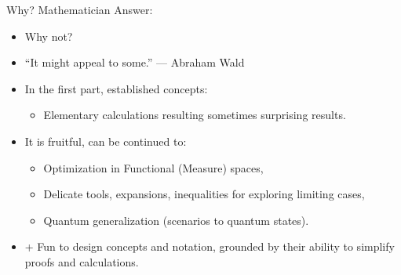\documentclass{beamer}
\theoremstyle{definition}
\begin{document}
\begin{frame}{Why? Mathematician Answer:}

\begin{itemize}
    \item Why not?
    \item ``It might appeal to some.'' --- Abraham Wald
    \item In the first part, established concepts:
    \begin{itemize}
        \item Elementary calculations resulting sometimes surprising results.
    \end{itemize}
    \item It is fruitful, can be continued to:
    \begin{itemize}
        \item Optimization in Functional (Measure) spaces,
        \item Delicate tools, expansions, inequalities for exploring limiting cases,
        \item Quantum generalization (scenarios to quantum states).
    \end{itemize}
    \item + Fun to design concepts and notation, grounded by their ability to simplify proofs and calculations.
\end{itemize}



\end{frame}
\end{document}
